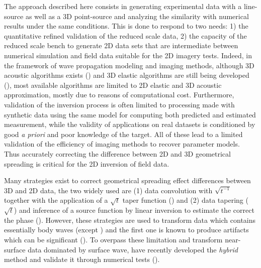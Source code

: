 \documentclass[extra,mreferee]{gji}
\begin{document}
The approach described here consists in generating experimental data with a line-source as well as a 3D point-source and analyzing the similarity with numerical results under the same conditions. This is done to respond to two needs: 1) the quantitative refined validation of the reduced scale data, 2) the capacity of the reduced scale bench to generate 2D data sets that are intermediate between numerical simulation and field data suitable for the 2D imagery tests. Indeed, in the framework of wave propagation modeling and imaging methods, although 3D acoustic algorithms exists (\cite{benhadjali_FWI_2008,plessix_FWI_2010}) and 3D elastic algorithms are still being developed (\cite{castellanos_AMD_2011,borisov2015three}), most available algorithms are limited to 2D elastic and 3D acoustic approximation, mostly due to reasons of computational cost. Furthermore,  validation of the inversion process is often limited to processing made with synthetic data using the same model for computing both predicted and estimated measurement, while the validity of applications on real datasets is conditioned by good \textit{a priori} and poor knowledge of the target. All of these lead to a limited validation of the efficiency of imaging methods to recover parameter models. Thus accurately correcting the difference between 2D and 3D geometrical spreading is critical for the 2D inversion of field data.

Many strategies exist to correct geometrical spreading effect differences between 3D and 2D data, the two widely used are (1) data convolution with $\sqrt{t^{-1}}$ together with the application of a $\sqrt{t}$ taper function (\cite{crase1990robust,shipp2002two,ravaut2004multiscale}) and (2) data tapering ($\sqrt{t}$) and inference of a source function by linear inversion to estimate the correct the phase (\cite{pratt1999fwi,bretaudeau2013fwi}). However, these strategies are used to transform data which contains essentially body waves (except \cite{bretaudeau2013fwi}) and the first one is known to produce artifacts which can be significant (\cite{auer2013critical}). To overpass these limitation and transform near-surface data dominated by surface wave, \cite{Forbriger_LSS_2014} have recently developed the \textit{hybrid} method and validate it through numerical tests (\cite{schafer2014lss}).
\end{document}
